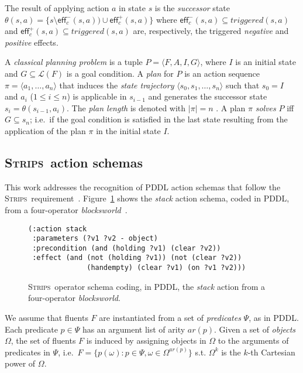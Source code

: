 \documentclass[letterpaper]{article} %
\newcommand{\tup}[1]{{\langle #1 \rangle}}
\newcommand{\eff}{\mathsf{eff}}     %
\newcommand{\strips}{\textsc{Strips}}     %
\begin{document}
The result of applying action $a$ in state $s$ is the {\em successor} state $\theta(s,a)=\{s\setminus\eff_c^-(s,a))\cup\eff_c^+(s,a)\}$ where $\eff_c^-(s,a)\subseteq triggered(s,a)$ and $\eff_c^+(s,a)\subseteq triggered(s,a)$ are, respectively, the triggered {\em negative} and {\em positive} effects.

A {\em classical planning problem} is a tuple $P=\tup{F,A,I,G}$, where $I$ is an initial state and $G\subseteq\mathcal{L}(F)$ is a goal condition. A {\em plan} for $P$ is an action sequence $\pi=\tup{a_1, \ldots, a_n}$ that induces the {\em state trajectory} $\tup{s_0, s_1, \ldots, s_n}$ such that $s_0=I$ and $a_i$ ({\small $1\leq i\leq n$}) is applicable in $s_{i-1}$ and generates the successor state $s_i=\theta(s_{i-1},a_i)$. The {\em plan length} is denoted with $|\pi|=n$ . A plan $\pi$ {\em solves} $P$ iff $G\subseteq s_n$; i.e.~if the goal condition is satisfied in the last state resulting from the application of the plan $\pi$ in the initial state $I$.

\subsection{\strips\ action schemas}
This work addresses the recognition of PDDL action schemas that follow the \strips\ requirement~\cite{mcdermott1998pddl,fox2003pddl2}. Figure~\ref{fig:stack} shows the {\em stack} action schema, coded in PDDL, from a four-operator {\em blocksworld}~\cite{slaney2001blocks}.

\begin{figure}[hbt!]
\begin{scriptsize}
\begin{verbatim}
(:action stack
 :parameters (?v1 ?v2 - object)
 :precondition (and (holding ?v1) (clear ?v2))
 :effect (and (not (holding ?v1)) (not (clear ?v2)) 
              (handempty) (clear ?v1) (on ?v1 ?v2)))
\end{verbatim}
\end{scriptsize}
 \caption{\small \strips\ operator schema coding, in PDDL, the {\em stack} action from a four-operator {\em blocksworld}.}
\label{fig:stack}
\end{figure}

We assume that fluents $F$ are instantiated from a set of {\em predicates} $\Psi$, as in PDDL. Each predicate $p\in\Psi$ has an argument list of arity $ar(p)$. Given a set of {\em objects} $\Omega$, the set of fluents $F$ is induced by assigning objects in $\Omega$ to the arguments of predicates in $\Psi$, i.e.~$F=\{p(\omega):p\in\Psi,\omega\in\Omega^{ar(p)}\}$ s.t. $\Omega^k$ is the $k$-th Cartesian power of $\Omega$.
\end{document}
